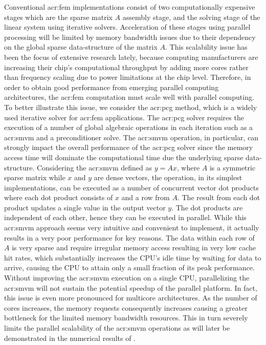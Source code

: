 Conventional \gls{acr:fem} implementations consist of two computationally expensive stages which are the sparse matrix $A$ assembly stage, and the solving stage of the linear system using iterative solvers.
Acceleration of these stages using parallel processing will be limited by memory bandwidth issues due to their dependency on the global sparse data-structure of the matrix $A$.
This scalability issue has been the focus of extensive research lately, because computing manufacturers are increasing their chip's computational throughput by adding more cores rather than frequency scaling due to power limitations at the chip level.
Therefore, in order to obtain good performance from emerging parallel computing architectures, the \gls{acr:fem} computation must scale well with parallel computing.
To better illustrate this issue, we consider the \gls{acr:pcg} method, which is a widely used iterative solver for \gls{acr:fem} applications.
The \gls{acr:pcg} solver requires the execution of a number of global algebraic operations in each iteration such as a \gls{acr:smvm} and a preconditioner solve.
The \gls{acr:smvm} operation, in particular, can strongly impact the overall performance of the \gls{acr:pcg} solver since the memory access time will dominate the computational time due the underlying sparse data-structure.
Considering the \gls{acr:smvm} defined as $y=Ax$, where $A$ is a symmetric sparse matrix while $x$ and $y$ are dense vectors, the operation, in its simplest implementations, can be executed as a number of concurrent vector dot products where each dot product consists of $x$ and a row from $A$.
The result from each dot product updates a single value in the output vector $y$.
The dot products are independent of each other, hence they can be executed in parallel.
While this \gls{acr:smvm} approach seems very intuitive and convenient to implement, it actually results in a very poor performance for key reasons.
The data within each row of $A$ is very sparse and require irregular memory access resulting in very low cache hit rates, which substantially increases the CPU's idle time by waiting for data to arrive, causing the CPU to attain only a small fraction of its peak performance.
Without improving the \gls{acr:smvm} execution on a single CPU, parallelizing the \gls{acr:smvm} will not sustain the potential speedup of the parallel platform.
In fact, this issue is even more pronounced for multicore architectures.
As the number of cores increases, the memory requests consequently increases causing a greater bottleneck for the limited memory bandwidth resources.
This in turn severely limits the parallel scalability of the \gls{acr:smvm} operations as will later be demonstrated in the numerical results of .


